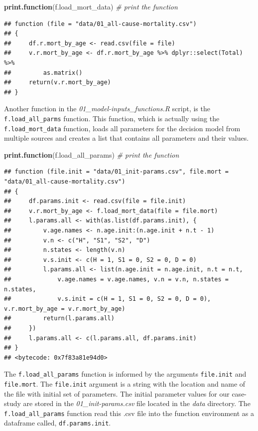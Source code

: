 \documentclass[]{article}
\newenvironment{Shaded}{\begin{snugshade}}{\end{snugshade}}
\newcommand{\KeywordTok}[1]{\textcolor[rgb]{0.13,0.29,0.53}{\textbf{#1}}}
\newcommand{\CommentTok}[1]{\textcolor[rgb]{0.56,0.35,0.01}{\textit{#1}}}
\newcommand{\NormalTok}[1]{#1}
\begin{document}
\begin{Shaded}
\begin{Highlighting}[]
\KeywordTok{print.function}\NormalTok{(f.load_mort_data) }\CommentTok{# print the function}
\end{Highlighting}
\end{Shaded}

\begin{verbatim}
## function (file = "data/01_all-cause-mortality.csv") 
## {
##     df.r.mort_by_age <- read.csv(file = file)
##     v.r.mort_by_age <- df.r.mort_by_age %>% dplyr::select(Total) %>% 
##         as.matrix()
##     return(v.r.mort_by_age)
## }
\end{verbatim}

Another function in the \emph{01\_model-inputs\_functions.R} script, is
the \texttt{f.load\_all\_parms} function. This function, which is
actually using the \texttt{f.load\_mort\_data} function, loads all
parameters for the decision model from multiple sources and creates a
list that contains all parameters and their values.

\begin{Shaded}
\begin{Highlighting}[]
\KeywordTok{print.function}\NormalTok{(f.load_all_params)  }\CommentTok{# print the function}
\end{Highlighting}
\end{Shaded}

\begin{verbatim}
## function (file.init = "data/01_init-params.csv", file.mort = "data/01_all-cause-mortality.csv") 
## {
##     df.params.init <- read.csv(file = file.init)
##     v.r.mort_by_age <- f.load_mort_data(file = file.mort)
##     l.params.all <- with(as.list(df.params.init), {
##         v.age.names <- n.age.init:(n.age.init + n.t - 1)
##         v.n <- c("H", "S1", "S2", "D")
##         n.states <- length(v.n)
##         v.s.init <- c(H = 1, S1 = 0, S2 = 0, D = 0)
##         l.params.all <- list(n.age.init = n.age.init, n.t = n.t, 
##             v.age.names = v.age.names, v.n = v.n, n.states = n.states, 
##             v.s.init = c(H = 1, S1 = 0, S2 = 0, D = 0), v.r.mort_by_age = v.r.mort_by_age)
##         return(l.params.all)
##     })
##     l.params.all <- c(l.params.all, df.params.init)
## }
## <bytecode: 0x7f83a81e94d0>
\end{verbatim}

The \texttt{f.load\_all\_params} function is informed by the arguments
\texttt{file.init} and \texttt{file.mort}. The \texttt{file.init}
argument is a string with the location and name of the file with initial
set of parameters. The initial parameter values for our case-study are
stored in the \emph{01\_init-params.csv} file located in the \emph{data}
directory. The \texttt{f.load\_all\_params} function read this .csv file
into the function environment as a dataframe called,
\texttt{df.params.init}.
\end{document}
